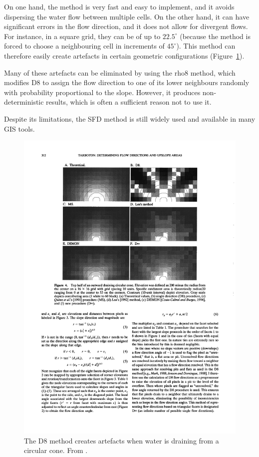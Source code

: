 On one hand, the method is very fast and easy to implement, and it avoids dispersing the water flow between multiple cells.
On the other hand, it can have significant errors in the flow direction, and it does not allow for divergent flows.
For instance, in a square grid, they can be of up to \(22.5^\circ{}\) (because the method is forced to choose a neighbouring cell in increments of \(45^\circ{}\)).
This method can therefore easily create artefacts in certain geometric configurations (Figure~\ref{fig:d8}).

Many of these artefacts can be eliminated by using the rho8 method, which modifies D8 to assign the flow direction to one of its lower neighbours randomly with probability proportional to the slope.
However, it produces non-deterministic results, which is often a sufficient reason not to use it.

Despite its limitations, the SFD method is still widely used and available in many GIS tools\@.

\begin{figure}[htbp]
\centering
\includegraphics[width=0.75\linewidth]{figs/d8.pdf}
\caption{The D8 method creates artefacts when water is draining from a circular cone. From \citet{Tarborton97}.}%
\label{fig:d8}
\end{figure}


